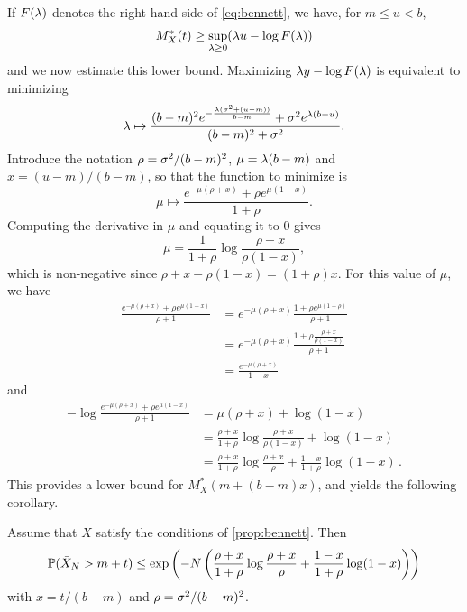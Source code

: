 If $F(\lambda)$ denotes the right-hand side of \eqref{eq:bennett},  we have, for $m\leq u < b$, 
\[
M_X^*(t) \geq \sup_{\lambda\geq 0} (\lambda u - \log F(\lambda))
\]
and we now estimate this lower bound. Maximizing $\lambda y - \log F(\lambda)$ is equivalent to minimizing
\[
\lambda \mapsto \frac{(b-m)^2 e^{-\frac{\lambda(\sigma^2+(u-m))}{b-m}} + \sigma^2 e^{\lambda (b-u)}}{(b-m)^2 + \sigma^2}.
\]
Introduce the notation $\rho = \sigma^2/(b-m)^2$, $\mu = \lambda(b-m)$ and $x = (u-m)/(b-m)$, so that the function to minimize is
\[
\mu\mapsto 
\frac{e^{-\mu(\rho+x)} + \rho e^{\mu (1-x)}}{1+\rho}.
\]
Computing the derivative in $\mu$ and equating it to 0 gives 
\[
\mu = \frac{1}{1+\rho}\log \frac{\rho+x}{\rho(1-x)},
\]
which is non-negative since $\rho + x - \rho(1-x) = (1+\rho) x$. 
For this value of $\mu$, we have 
\begin{align*}
\frac{e^{-\mu(\rho+x)} + \rho e^{\mu (1-x)}}{\rho+1} & = e^{-\mu(\rho+x)} \frac{1 + \rho e^{\mu (1+\rho)}}{\rho+1}\\
&= e^{-\mu(\rho+x)} \frac{1 + \rho\frac{\rho+x}{\rho(1-x)}}{\rho+1}\\
&= \frac{e^{-\mu(\rho+x)}}{1-x}
\end{align*} 
and
\begin{align*}
-\log\frac{e^{-\mu(\rho+x)} + \rho e^{\mu (1-x)}}{\rho+1} & = \mu(\rho+x) + \log(1-x)\\
&= \frac{\rho+x}{1+\rho}\log \frac{\rho+x}{\rho(1-x)} + \log(1-x) \\
&= \frac{\rho+x}{1+\rho}\log \frac{\rho+x}{\rho} + \frac{1-x}{1+\rho}\log(1-x)\,.
\end{align*}
This provides a lower bound for $M_X^*(m + (b-m)x)$, and yields the following corollary.
\begin{corollary}
\label{coro:bennett}
Assume that  $X$ satisfy the conditions of \cref{prop:bennett}. Then
\begin{equation}
\label{eq:bennett.bound}
\bm{\mathbb P}(\bar X_N > m+t) \leq \exp\left(-N\left(\frac{\rho+x}{1+\rho}\log \frac{\rho+x}{\rho} + \frac{1-x}{1+\rho}\log(1-x)\right)\right)
\end{equation}
with $x = t/(b-m)$ and $\rho = \sigma^2/(b-m)^2$. 
\end{corollary}

